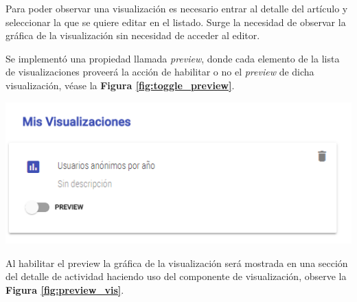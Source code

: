 \begin{enumerate}
  Para poder observar una visualización es necesario entrar al detalle del artículo y seleccionar la que se quiere editar en el listado. Surge la necesidad de observar la gráfica de la visualización sin necesidad de acceder al editor.
  
  
  Se implementó una propiedad llamada \textit{preview}, donde cada elemento de la lista de visualizaciones proveerá la acción de habilitar o no el \textit{preview} de dicha visualización, véase la \textbf{Figura \ref{fig:toggle_preview}}.
  
  \begin{center}
    \bigbreak
    \includegraphics[scale=0.7]{images/marco_aplicativo/toggle_preview.png}
    \label{fig:toggle_preview}
    \bigbreak
  \end{center}
  
  Al habilitar el preview la gráfica de la visualización será mostrada en una sección del detalle de actividad haciendo uso del componente de visualización, observe la \textbf{Figura \ref{fig:preview_vis}}.
  

\end{enumerate}
